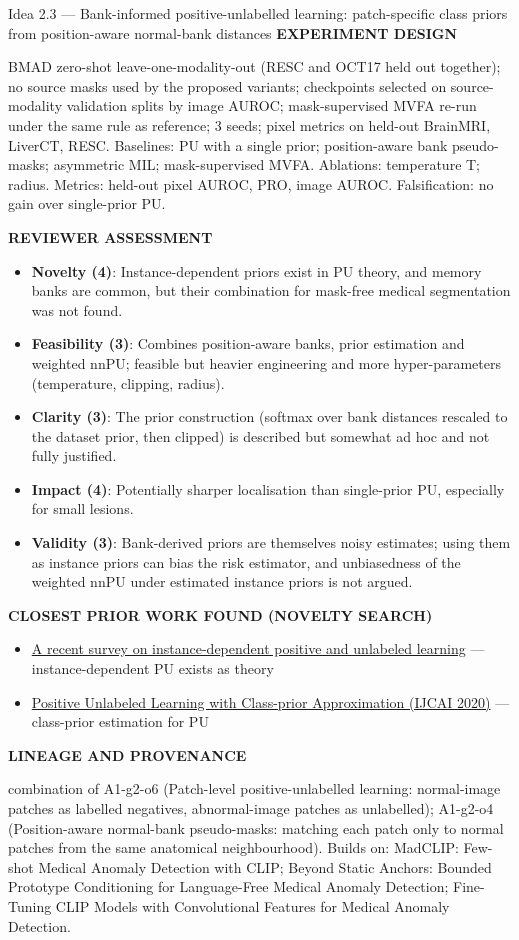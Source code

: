 \documentclass[11pt,a4paper]{article}
\newcommand{\lbl}[1]{{\sffamily\footnotesize\bfseries\color{muted}\MakeUppercase{#1}}\par}
\begin{document}
\begin{ideabox}{Idea 2.3 — Bank-informed positive-unlabelled learning: patch-specific class priors from position-aware normal-bank distances}
\lbl{Experiment design}BMAD zero-shot leave-one-modality-out (RESC and OCT17 held out together); no source masks used by the proposed variants; checkpoints selected on source-modality validation splits by image AUROC; mask-supervised MVFA re-run under the same rule as reference; 3 seeds; pixel metrics on held-out BrainMRI, LiverCT, RESC. Baselines: PU with a single prior; position-aware bank pseudo-masks; asymmetric MIL; mask-supervised MVFA. Ablations: temperature T; radius. Metrics: held-out pixel AUROC, PRO, image AUROC. Falsification: no gain over single-prior PU.

\lbl{Reviewer assessment}\begin{itemize}[leftmargin=1.2em,itemsep=1pt,topsep=2pt]
\item \textbf{Novelty (4)}: Instance-dependent priors exist in PU theory, and memory banks are common, but their combination for mask-free medical segmentation was not found.
\item \textbf{Feasibility (3)}: Combines position-aware banks, prior estimation and weighted nnPU; feasible but heavier engineering and more hyper-parameters (temperature, clipping, radius).
\item \textbf{Clarity (3)}: The prior construction (softmax over bank distances rescaled to the dataset prior, then clipped) is described but somewhat ad hoc and not fully justified.
\item \textbf{Impact (4)}: Potentially sharper localisation than single-prior PU, especially for small lesions.
\item \textbf{Validity (3)}: Bank-derived priors are themselves noisy estimates; using them as instance priors can bias the risk estimator, and unbiasedness of the weighted nnPU under estimated instance priors is not argued.
\end{itemize}
\lbl{Closest prior work found (novelty search)}\begin{itemize}[leftmargin=1.2em,itemsep=1pt,topsep=2pt]
\item \href{https://www.ncbi.nlm.nih.gov/pmc/articles/PMC11997483/}{A recent survey on instance-dependent positive and unlabeled learning} — instance-dependent PU exists as theory
\item \href{https://www.ijcai.org/proceedings/2020/279}{Positive Unlabeled Learning with Class-prior Approximation (IJCAI 2020)} — class-prior estimation for PU
\end{itemize}
\lbl{Lineage and provenance}{\small combination of A1-g2-o6 (Patch-level positive-unlabelled learning: normal-image patches as labelled negatives, abnormal-image patches as unlabelled); A1-g2-o4 (Position-aware normal-bank pseudo-masks: matching each patch only to normal patches from the same anatomical neighbourhood). Builds on: MadCLIP: Few-shot Medical Anomaly Detection with CLIP; Beyond Static Anchors: Bounded Prototype Conditioning for Language-Free Medical Anomaly Detection; Fine-Tuning CLIP Models with Convolutional Features for Medical Anomaly Detection.}
\end{ideabox}
\end{document}

